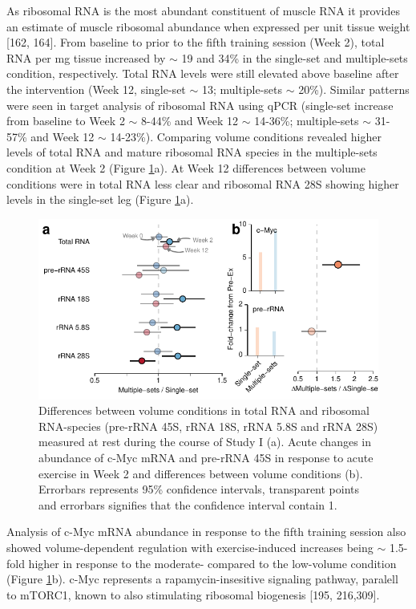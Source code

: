 \documentclass[twoside,10pt]{gihclass} %
\begin{document}
As ribosomal RNA is the most abundant constituent of muscle RNA it provides an estimate of muscle ribosomal abundance when expressed per unit tissue weight
{[}162, 164{]}.
From baseline to prior to the fifth training session (Week 2), total RNA per mg tissue increased by \(\sim\) 19 and 34\% in the single-set and multiple-sets condition, respectively. Total RNA levels were still elevated above baseline after the intervention (Week 12, single-set \(\sim\) 13; multiple-sets \(\sim\) 20\%). Similar patterns were seen in target analysis of ribosomal RNA using qPCR (single-set increase from baseline to Week 2 \(\sim\) 8-44\% and Week 12 \(\sim\) 14-36\%; multiple-sets \(\sim\) 31-57\% and Week 12 \(\sim\) 14-23\%). Comparing volume conditions revealed higher levels of total RNA and mature ribosomal RNA species in the multiple-sets condition at Week 2 (Figure \ref{fig:rrna-fig}a). At Week 12 differences between volume conditions were in total RNA less clear and ribosomal RNA 28S showing higher levels in the single-set leg (Figure \ref{fig:rrna-fig}a).
\begin{figure}

{\centering \includegraphics{thesis_files/figure-latex/rrna-fig-1} 

}

\caption[Differences between volume conditions total RNA and ribosomal RNA]{Differences between volume conditions in total RNA and ribosomal RNA-species (pre-rRNA 45S, rRNA 18S, rRNA 5.8S and rRNA 28S) measured at rest during the course of Study I (a). Acute changes in abundance of c-Myc mRNA and pre-rRNA 45S in response to acute exercise in Week 2 and differences between volume conditions (b). Errorbars represents 95\% confidence intervals, transparent points and errorbars signifies that the confidence interval contain 1.}\label{fig:rrna-fig}
\end{figure}
Analysis of c-Myc mRNA abundance in response to the fifth training session also showed volume-dependent regulation with exercise-induced increases being \(\sim\) 1.5-fold higher in response to the moderate- compared to the low-volume condition (Figure \ref{fig:rrna-fig}b). c-Myc represents a rapamycin-insesitive signaling pathway, paralell to mTORC1, known to also stimulating ribosomal biogenesis
{[}195, 216,309{]}.
\end{document}

